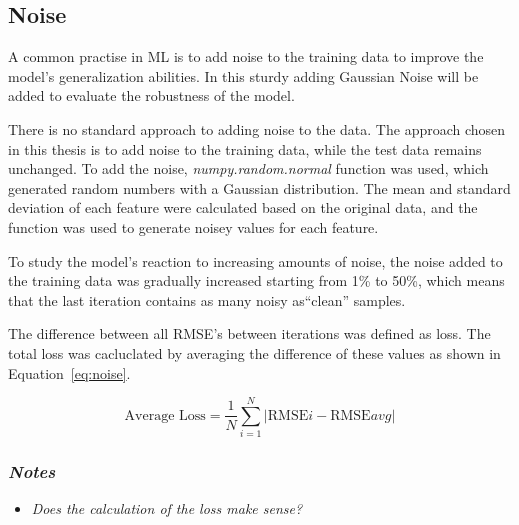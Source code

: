 %

\subsection{Noise}\label{subsec:noise}
A common practise in \ac{ML} is to add noise to the training data to improve
the model's
generalization abilities.
In this sturdy adding Gaussian Noise will be added to evaluate the robustness
of the model.

There is no standard approach to adding noise to the data. The approach
chosen in this thesis
is to add noise to the training data, while the test data remains unchanged.
To add the noise, \textit{numpy.random.normal} function was used, which
generated random numbers
with a Gaussian distribution.
The mean and standard deviation of each feature were calculated based on the
original data, and
the function was used to generate noisey values for each feature.

To study the model's reaction to increasing amounts of noise, the noise added
to the training
data was gradually increased starting from 1\% to 50\%, which means that the
last iteration
contains as many noisy as``clean'' samples.

The difference between all \ac{RMSE}'s between iterations was defined as loss.
The total loss was cacluclated by averaging the difference of these values as
shown in
Equation~\ref{eq:noise}.

\begin{tcolorbox}[arc=0pt,boxrule=0.5pt]
    \begin{equation}
        \text{Average Loss} = \frac{1}{N} \sum_{i=1}^{N} |\text{RMSE}i -
        \text{RMSE}{avg}|\label
        {eq:noise}
    \end{equation}
\end{tcolorbox}

\subsubsection*{\textit{Notes}}

\begin{itemize}
    \item \textit{Does the calculation of the loss make sense?}
\end{itemize}

